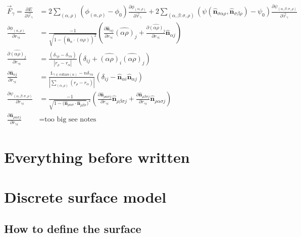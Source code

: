 \begin{align*}
    \vec{F}_\gamma = \frac{\partial E}{\partial \vec{r}_\gamma} &= 2 \sum_{(\alpha, \rho)} \left( \phi_{(\alpha,\rho)} - \phi_0 \right) \frac{\partial \phi_{(\alpha,\rho)}}{\partial \vec{r}_\gamma} + 2 \sum_{(\alpha, \beta: \sigma, \rho)} \left( \psi(\hat{\bm{n}}_{\sigma\alpha\rho}, \hat{\bm{n}}_{\sigma\beta\rho}) - \psi_0 \right) \frac{\partial \psi_{(\alpha, \beta: \sigma, \rho)}}{\partial \vec{r}_\gamma} \\
    \frac{\partial \phi_{(\alpha,\rho)}}{\partial r_{\gamma i}} &= \frac{-1}{\sqrt{1 - (\hat{\bm{n}}_\alpha \cdot \hat{(\alpha\rho)})^2}} \left(\frac{\partial \hat{\bm{n}}_{\alpha j}}{\partial r_{\gamma i}} \hat{(\alpha\rho)}_j + \frac{\partial \hat{(\alpha\rho)}_j}{\partial r_{\gamma i}} \hat{\bm{n}}_{\alpha j} \right) \\
    \frac{\partial \hat{(\alpha\rho)}_j}{\partial r_{\gamma i}} &= \frac{(\delta_{\gamma\rho} - \delta_{\gamma\alpha})}{|r_\rho - r_\alpha|} \left( \delta_{ij} + \hat{(\alpha\rho)}_i\hat{(\alpha\rho)}_j \right) \\
    \frac{\partial \hat{\bm{n}}_{\alpha j}}{\partial r_{\gamma i}} &= \frac{\mathbb{1}_{\gamma\in \text{collars}(\alpha)} - n\delta_{\gamma\alpha}}{\left| \sum_{(\alpha, \rho)} (r_\rho - r_\alpha) \right|} \left(\delta_{ij} - \hat{\bm{n}}_{\alpha i} \hat{\bm{n}}_{\alpha j} \right) \\
    \frac{\partial \psi_{(\alpha, \beta: \sigma, \rho)}}{\partial r_{\gamma i}} &= \frac{-1}{\sqrt{1 - (\hat{\bm{n}}_{\rho\alpha\sigma} \cdot \hat{\bm{n}}_{\rho\beta\sigma}})^2} \left(\frac{\partial \hat{\bm{n}}_{\rho\alpha\sigma j}}{\partial r_{\gamma i}} \hat{\bm{n}}_{\rho\beta\sigma j} + \frac{\partial \hat{\bm{n}}_{\rho\beta\sigma j}}{\partial r_{\gamma i}} \hat{\bm{n}}_{\rho\alpha\sigma j} \right) \\
    \frac{\partial \hat{\bm{n}}_{\rho\alpha\sigma j}}{\partial r_{\gamma i}} &= \text{too big see notes}
\end{align*}
\section{Everything before written}
\section{Discrete surface model}
\subsection{How to define the surface}


